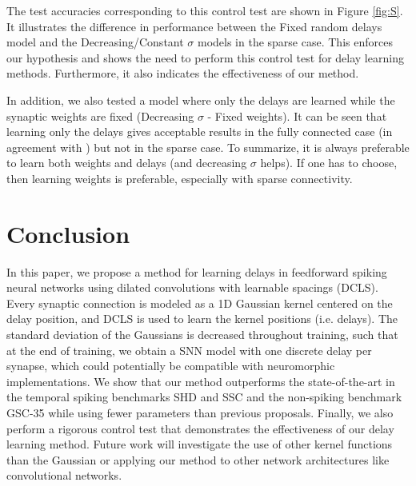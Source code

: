 \documentclass{article} \usepackage{iclr2024_conference,times}
\begin{document}
The test accuracies corresponding to this control test are shown in Figure \ref{fig:S}. It illustrates the difference in performance between the Fixed random delays model and the Decreasing/Constant $\sigma$ models in the sparse case. This enforces our hypothesis and shows the need to perform this control test for delay learning methods. Furthermore, it also indicates the effectiveness of our method.

In addition, we also tested a model where only the delays are learned while the synaptic weights are fixed (Decreasing $\sigma$ - Fixed weights). It can be seen that learning only the delays gives acceptable results in the fully connected case (in agreement with \citet{beyondweights}) but not in the sparse case. To summarize, it is always preferable to learn both weights and delays (and decreasing $\sigma$ helps). If one has to choose, then learning weights is preferable, especially with sparse connectivity.












\section{Conclusion}



In this paper, we propose a method for learning delays in feedforward spiking neural networks using dilated convolutions with learnable spacings (DCLS). Every synaptic connection is modeled as a 1D Gaussian kernel centered on the delay position, and DCLS is used to learn the kernel positions (i.e. delays). The standard deviation of the Gaussians is decreased throughout training, such that at the end of training, we obtain a SNN model with one discrete delay per synapse, which could potentially be compatible with neuromorphic implementations. We show that our method outperforms the state-of-the-art in the temporal spiking benchmarks SHD and SSC and the non-spiking benchmark GSC-35 while using fewer parameters than previous proposals. Finally, we also perform a rigorous control test that demonstrates the effectiveness of our delay learning method. Future work will investigate the use of other kernel functions than the Gaussian or applying our method to other network architectures like convolutional networks.
\end{document}
